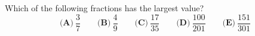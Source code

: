 Which of the following fractions has the largest value?
\[\textbf{(A)}\ \dfrac37\qquad\textbf{(B)}\ \dfrac49\qquad\textbf{(C)}\ \dfrac{17}{35}\qquad\textbf{(D)}\ \dfrac{100}{201}\qquad\textbf{(E)}\ \dfrac{151}{301}\]
